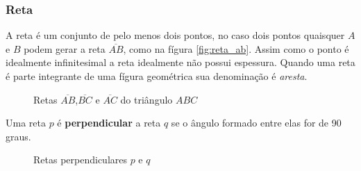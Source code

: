 \begin{multicols*}{2}

    \subsubsection*{Reta}
    A reta é um conjunto de pelo menos dois pontos, no caso dois pontos quaisquer $A$ e $B$ podem gerar a reta $\overline{AB}$, como na fígura \ref{fig:reta_ab}.
    Assim como o ponto é idealmente infinitesimal a reta idealmente não possui espessura. Quando uma reta é parte
    integrante de uma fígura geométrica sua denominação é \textit{aresta}.

    \begin{figure}[H]
        \centering
        \caption{Retas $\overline{AB}$,$\overline{BC}$ e $\overline{AC}$ do triângulo $ABC$}
        \label{fig:tri_abc}
    \end{figure}


    Uma reta $p$ é \textbf{perpendicular} a reta $q$ se o ângulo formado entre elas for de 90 graus.

    \begin{figure}[H]
        \centering
        \caption{Retas perpendiculares $p$ e $q$}
    \end{figure}


\end{multicols*}
